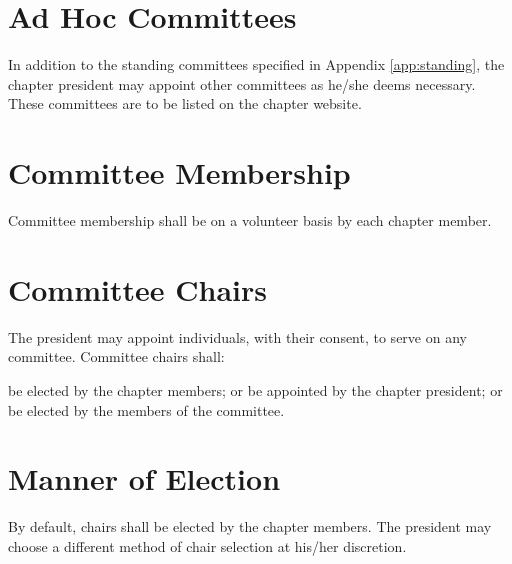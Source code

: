 \section{Ad Hoc Committees}
In addition to the standing committees specified in Appendix \ref{app:standing}, the chapter president may appoint other committees as he/she deems necessary. These committees are to be listed on the chapter website.

\section{Committee Membership}
Committee membership shall be on a volunteer basis by each chapter member.

\section{Committee Chairs}
The president may appoint individuals, with their consent, to serve on any committee. Committee chairs shall:

\begin{enumsubsection}
\itemnotoc be elected by the chapter members; or
\itemnotoc be appointed by the chapter president; or
\itemnotoc be elected by the members of the committee.
\end{enumsubsection}

\section{Manner of Election}
By default, chairs shall be elected by the chapter members.
The president may choose a different method of chair selection at his/her discretion.